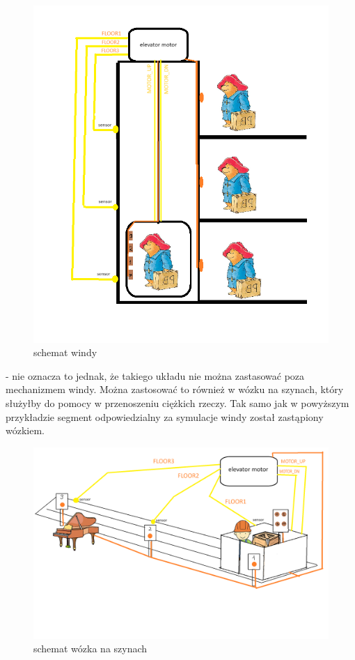 \documentclass[a4paper]{article}
\begin{document}
       \begin{figure}[H]
        \centering
        \includegraphics[width=\textwidth]{elevator.png}
        \caption{schemat windy}
    \end{figure}
- nie oznacza to jednak, że takiego układu nie można zastasować poza mechanizmem windy. Można zastosować to również w wózku na szynach,
 który służyłby do pomocy w przenoszeniu ciężkich rzeczy. Tak samo jak w powyższym przykładzie segment odpowiedzialny za symulacje windy został zastąpiony wózkiem.
 \begin{figure}[H]
    \centering
    \includegraphics[width=\textwidth]{nieelevator.png}
    \caption{schemat wózka na szynach}
\end{figure}
\end{document}
